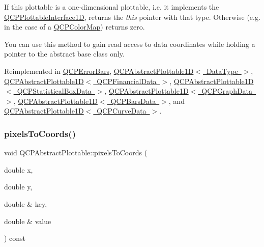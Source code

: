 If this plottable is a one-\/dimensional plottable, i.\+e. it implements the \mbox{\hyperlink{class_q_c_p_plottable_interface1_d}{Q\+C\+P\+Plottable\+Interface1D}}, returns the {\itshape this} pointer with that type. Otherwise (e.\+g. in the case of a \mbox{\hyperlink{class_q_c_p_color_map}{Q\+C\+P\+Color\+Map}}) returns zero.

You can use this method to gain read access to data coordinates while holding a pointer to the abstract base class only. 

Reimplemented in \mbox{\hyperlink{class_q_c_p_error_bars_a0b6fbf3a943b4241ee485d066cc8562a}{Q\+C\+P\+Error\+Bars}}, \mbox{\hyperlink{class_q_c_p_abstract_plottable1_d_a3ab7511c279af967955369606c584dd6}{Q\+C\+P\+Abstract\+Plottable1\+D$<$ Data\+Type $>$}}, \mbox{\hyperlink{class_q_c_p_abstract_plottable1_d_a3ab7511c279af967955369606c584dd6}{Q\+C\+P\+Abstract\+Plottable1\+D$<$ Q\+C\+P\+Financial\+Data $>$}}, \mbox{\hyperlink{class_q_c_p_abstract_plottable1_d_a3ab7511c279af967955369606c584dd6}{Q\+C\+P\+Abstract\+Plottable1\+D$<$ Q\+C\+P\+Statistical\+Box\+Data $>$}}, \mbox{\hyperlink{class_q_c_p_abstract_plottable1_d_a3ab7511c279af967955369606c584dd6}{Q\+C\+P\+Abstract\+Plottable1\+D$<$ Q\+C\+P\+Graph\+Data $>$}}, \mbox{\hyperlink{class_q_c_p_abstract_plottable1_d_a3ab7511c279af967955369606c584dd6}{Q\+C\+P\+Abstract\+Plottable1\+D$<$ Q\+C\+P\+Bars\+Data $>$}}, and \mbox{\hyperlink{class_q_c_p_abstract_plottable1_d_a3ab7511c279af967955369606c584dd6}{Q\+C\+P\+Abstract\+Plottable1\+D$<$ Q\+C\+P\+Curve\+Data $>$}}.

\mbox{\label{class_q_c_p_abstract_plottable_a3903c1120ab5c27e7fa46b597ef267bd}} 
\subsubsection{\texorpdfstring{pixels\+To\+Coords()}{pixelsToCoords()}\hspace{0.1cm}{\footnotesize\ttfamily [1/2]}}
{\footnotesize\ttfamily void Q\+C\+P\+Abstract\+Plottable\+::pixels\+To\+Coords (\begin{DoxyParamCaption}\item[{double}]{x,  }\item[{double}]{y,  }\item[{double \&}]{key,  }\item[{double \&}]{value }\end{DoxyParamCaption}) const}

